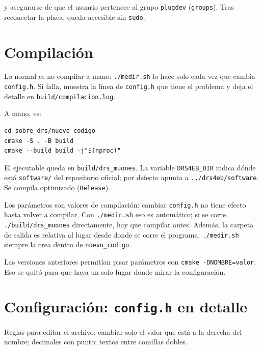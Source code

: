\documentclass[11pt,a4paper]{article}
\newcommand{\code}[1]{\texttt{#1}}
\begin{document}
y asegurarse de que el usuario pertenece al grupo \code{plugdev} (\code{groups}).
Tras reconectar la placa, queda accesible sin \code{sudo}.

\section{Compilación}

Lo normal es no compilar a mano: \code{./medir.sh} lo hace solo cada vez que cambia
\code{config.h}. Si falla, muestra la línea de \code{config.h} que tiene el problema
y deja el detalle en \code{build/compilacion.log}.

A mano, es:

\begin{lstlisting}[style=shell]
cd sobre_drs/nuevo_codigo
cmake -S . -B build
cmake --build build -j"$(nproc)"
\end{lstlisting}

El ejecutable queda en \code{build/drs\_muones}. La variable \code{DRS4EB\_DIR} indica
dónde está \code{software/} del repositorio oficial; por defecto apunta a
\code{../drs4eb/software}. Se compila optimizado (\code{Release}).

\begin{aviso}
Los parámetros son valores de compilación: cambiar \code{config.h} no tiene efecto
hasta volver a compilar. Con \code{./medir.sh} eso es automático; si se corre
\code{./build/drs\_muones} directamente, hay que compilar antes. Además, la carpeta
de salida es relativa al lugar desde donde se corre el programa: \code{./medir.sh}
siempre la crea dentro de \code{nuevo\_codigo}.
\end{aviso}

Las versiones anteriores permitían pisar parámetros con \code{cmake -DNOMBRE=valor}.
Eso se quitó para que haya un solo lugar donde mirar la configuración.

\section{Configuración: \code{config.h} en detalle}

Reglas para editar el archivo: cambiar solo el valor que está a la derecha del
nombre; decimales con punto; textos entre comillas dobles.
\end{document}
